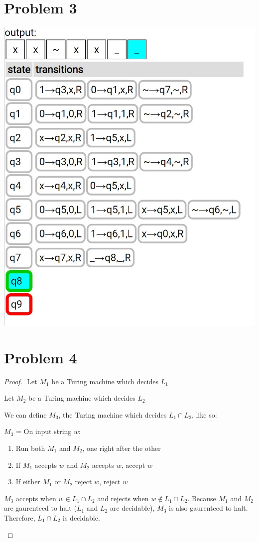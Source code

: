 \documentclass{article}
\newenvironment{problem}[1]{
  \nobreak\section*{Problem #1}
}{}
\begin{document}
\begin{problem}{3}
\begin{center}
      \includegraphics[scale=0.5]{images/18.jpg}
    \end{center}
  \end{problem}

  \begin{problem}{4}
    \begin{proof}
      $ $\newline
      Let $M_1$ be a Turing machine which decides $L_1$
      
      \noindent
      Let $M_2$ be a Turing machine which decides $L_2$

      \noindent
      We can define $M_3$, the Turing machine which decides
      $L_1 \cap L_2$, like so:

      \begin{center}
        $M_3$ = On input string $w$: \begin{enumerate}
          \item Run both $M_1$ and $M_2$, one right after the other
          \item If $M_1$ accepts $w$ and $M_2$ accepts $w$, accept $w$
          \item If either $M_1$ or $M_2$ reject $w$, reject $w$
        \end{enumerate}
      \end{center}

      \noindent
      $M_3$ accepts when $w \in L_1 \cap L_2$ and rejects when
      $w \notin L_1 \cap L_2$.  Because $M_1$ and $M_2$ are
      gaurenteed to halt ($L_1$ and $L_2$ are decidable), $M_3$ is
      also gaurenteed to halt.  Therefore, $L_1 \cap L_2$ is
      decidable.
      
      $ $\newline
    \end{proof}
  \end{problem}
\end{document}
